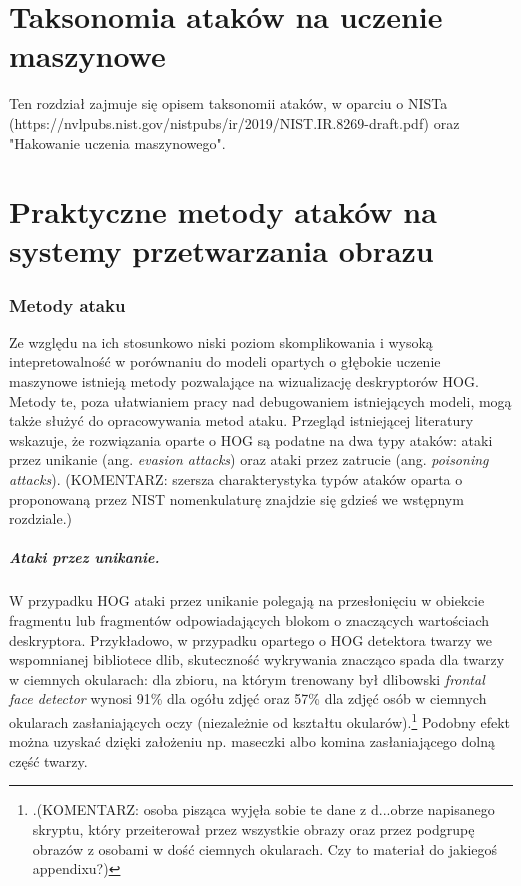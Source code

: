 \documentclass[12pt,a4paper,leqno,oneside,titlepage]{book}
\begin{document}
\chapter{Taksonomia ataków na uczenie maszynowe}

Ten rozdział zajmuje się opisem taksonomii ataków, w oparciu o NISTa (https://nvlpubs.nist.gov/nistpubs/ir/2019/NIST.IR.8269-draft.pdf) oraz "Hakowanie uczenia maszynowego".

%
%
%
%
%
%
%
%
%
%

\chapter{Praktyczne metody ataków na systemy przetwarzania obrazu}


\subsection{Metody ataku}
Ze względu na ich stosunkowo niski poziom skomplikowania i wysoką intepretowalność w porównaniu do modeli opartych o głębokie uczenie maszynowe istnieją metody pozwalające na wizualizację deskryptorów HOG. Metody te, poza ułatwianiem pracy nad debugowaniem istniejących modeli, mogą także służyć do opracowywania metod ataku. Przegląd istniejącej literatury wskazuje, że rozwiązania oparte o HOG są podatne na dwa typy ataków: ataki przez unikanie (ang. \textit{evasion attacks}) oraz ataki przez zatrucie (ang. \textit{poisoning attacks})\cite{Hoggles, MacDonald19}. (KOMENTARZ: szersza charakterystyka typów ataków oparta o proponowaną przez NIST nomenkulaturę znajdzie się gdzieś we wstępnym rozdziale.)

\paragraph{Ataki przez unikanie.}
W przypadku HOG ataki przez unikanie polegają na przesłonięciu w obiekcie fragmentu lub fragmentów odpowiadających blokom o znaczących wartościach deskryptora. Przykładowo, w przypadku opartego o HOG detektora twarzy we wspomnianej bibliotece dlib, skuteczność wykrywania znacząco spada dla twarzy w ciemnych okularach: dla zbioru, na którym trenowany był dlibowski \textit{frontal face detector} wynosi 91\% dla ogółu zdjęć oraz 57\% dla zdjęć osób w ciemnych okularach zasłaniających oczy (niezależnie od kształtu okularów).\footnote{.(KOMENTARZ: osoba pisząca wyjęła sobie te dane z d...obrze napisanego skryptu, który przeiterował przez wszystkie obrazy oraz przez podgrupę obrazów z osobami w dość ciemnych okularach. Czy to materiał do jakiegoś appendixu?) } Podobny efekt można uzyskać dzięki założeniu np. maseczki albo komina zasłaniającego dolną część twarzy\cite{dlibPage, MacDonald19}.
\end{document}
